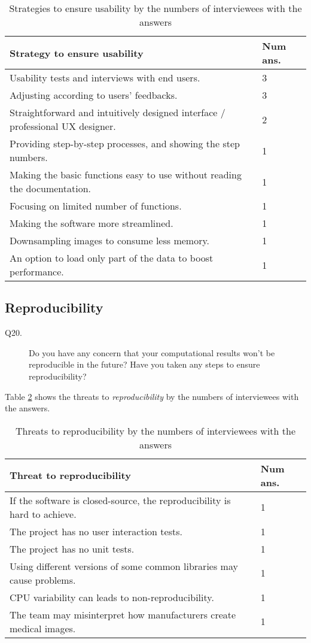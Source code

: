 \begin{table}[H]
\centering
\begin{tabular}{ll}
\hline
Strategy to ensure usability & Num ans. \\ \hline
Usability tests and interviews with end users. & 3 \\
Adjusting according to users' feedbacks. & 3 \\
Straightforward and intuitively designed interface / professional UX designer. & 2 \\
Providing step-by-step processes, and showing the step numbers. & 1 \\
Making the basic functions easy to use without reading the documentation. & 1 \\
Focusing on limited number of functions. & 1 \\
Making the software more streamlined. & 1 \\
Downsampling images to consume less memory. & 1 \\
An option to load only part of the data to boost performance. & 1 \\ \hline
\end{tabular}
\caption{\label{tab_q18_strategies_usability}Strategies to ensure usability by the numbers of interviewees with the answers}
\end{table}

\subsection{Reproducibility}
\label{sec_interview_reproducibility}
\begin{description}
\item[Q20.] Do you have any concern that your computational results won’t be reproducible in the future? Have you taken any steps to ensure reproducibility?
\end{description}

Table \ref{tab_q20_threats_reproducibility} shows the threats to \textit{reproducibility} by the numbers of interviewees with the answers.

\begin{table}[H]
\centering
\begin{tabular}{ll}
\hline
Threat to reproducibility & Num ans. \\ \hline
If the software is closed-source, the reproducibility is hard to achieve. & 1 \\
The project has no user interaction tests. & 1 \\
The project has no unit tests. & 1 \\
Using different versions of some common libraries may cause problems. & 1 \\
CPU variability can leads to non-reproducibility. & 1 \\
The team may misinterpret how manufacturers create medical images. & 1 \\ \hline
\end{tabular}
\caption{\label{tab_q20_threats_reproducibility}Threats to reproducibility by the numbers of interviewees with the answers}
\end{table}

